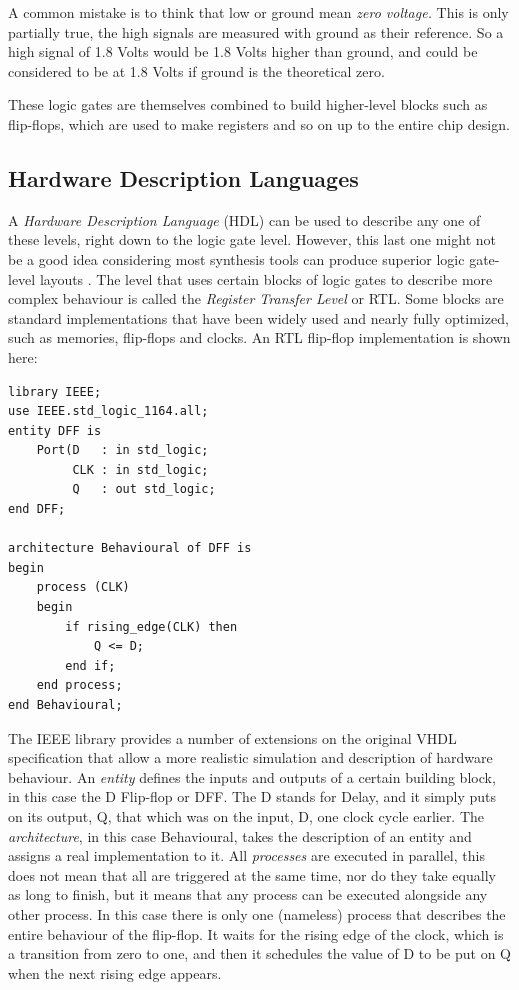 \documentclass[11pt,british]{article}
\begin{document}
A common mistake is to think that low or ground mean \emph{zero voltage.}
This is only partially true, the high signals are measured with ground
as their reference. So a high signal of 1.8 Volts would be 1.8 Volts
higher than ground, and could be considered to be at 1.8 Volts if
ground is the theoretical zero.

These logic gates are themselves combined to build higher-level
blocks such as flip-flops, which are used to make registers and so
on up to the entire chip design.

\pagebreak

\subsection{Hardware Description Languages}

A \emph{Hardware Description Language} (HDL) can be used to describe
any one of these levels, right down to the logic gate level. However,
this last one might not be a good idea considering most synthesis
tools can produce superior logic gate-level layouts \cite{key-1}.
The level that uses certain blocks of logic gates to describe more
complex behaviour is called the \emph{Register Transfer Level} or
RTL. Some blocks are standard implementations that have been widely
used and nearly fully optimized, such as memories, flip-flops and
clocks. An RTL flip-flop implementation is shown here: 

\begin{lstlisting}[tabsize=4, frame=single, framesep=2mm, belowskip=16pt, aboveskip=16pt]
library IEEE;
use IEEE.std_logic_1164.all;
entity DFF is
	Port(D 	 : in std_logic;
		 CLK : in std_logic;
		 Q 	 : out std_logic;
end DFF;

architecture Behavioural of DFF is
begin
	process (CLK)
	begin
		if rising_edge(CLK) then
			Q <= D;
		end if;
	end process;
end Behavioural;
\end{lstlisting}


The IEEE library provides a number of extensions on the original VHDL
specification that allow a more realistic simulation and description of hardware
behaviour. An \emph{entity} defines the inputs and outputs of a certain building
block, in this case the D Flip-flop or DFF. The D stands for Delay,
and it simply puts on its output, Q, that which was on the input, D, one
clock cycle earlier. The \emph{architecture}, in this case Behavioural, takes
the description of an entity and assigns a real implementation to
it. All \emph{processes} are executed in parallel, this does not mean that
all are triggered at the same time, nor do they take equally as long to finish,
but it means that any process can be executed alongside any other
process. In this case there is only one (nameless) process that describes
the entire behaviour of the flip-flop. It waits for the rising edge
of the clock, which is a transition from zero to one, and then it
schedules the value of D to be put on Q when the next rising edge appears.\\
\end{document}
